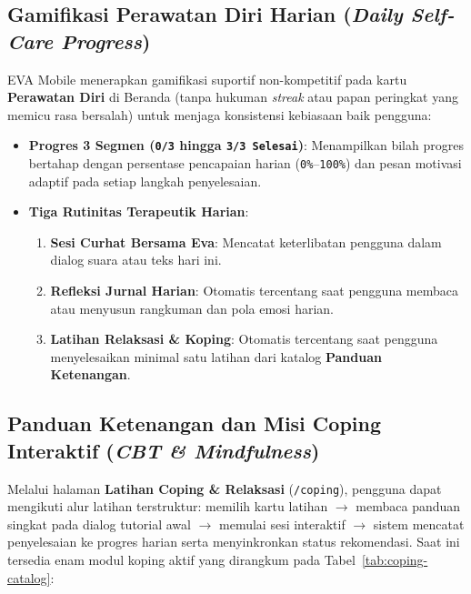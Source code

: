 \subsection{Gamifikasi Perawatan Diri Harian (\textit{Daily Self-Care Progress})}
EVA Mobile menerapkan gamifikasi suportif non-kompetitif pada kartu \textbf{Perawatan Diri} di Beranda (tanpa hukuman \textit{streak} atau papan peringkat yang memicu rasa bersalah) untuk menjaga konsistensi kebiasaan baik pengguna:
\begin{itemize}[leftmargin=1.4em]
  \item \textbf{Progres 3 Segmen (\texttt{0/3} hingga \texttt{3/3 Selesai})}: Menampilkan bilah progres bertahap dengan persentase pencapaian harian (\texttt{0\%}--\texttt{100\%}) dan pesan motivasi adaptif pada setiap langkah penyelesaian.
  \item \textbf{Tiga Rutinitas Terapeutik Harian}:
  \begin{enumerate}[leftmargin=1.4em]
    \item \textbf{Sesi Curhat Bersama Eva}: Mencatat keterlibatan pengguna dalam dialog suara atau teks hari ini.
    \item \textbf{Refleksi Jurnal Harian}: Otomatis tercentang saat pengguna membaca atau menyusun rangkuman dan pola emosi harian.
    \item \textbf{Latihan Relaksasi \& Koping}: Otomatis tercentang saat pengguna menyelesaikan minimal satu latihan dari katalog \textbf{Panduan Ketenangan}.
  \end{enumerate}
\end{itemize}


\subsection{Panduan Ketenangan dan Misi Coping Interaktif (\textit{CBT \& Mindfulness})}
Melalui halaman \textbf{Latihan Coping \& Relaksasi} (\texttt{/coping}), pengguna dapat mengikuti alur latihan terstruktur: memilih kartu latihan $\rightarrow$ membaca panduan singkat pada dialog tutorial awal $\rightarrow$ memulai sesi interaktif $\rightarrow$ sistem mencatat penyelesaian ke progres harian serta menyinkronkan status rekomendasi. Saat ini tersedia enam modul koping aktif yang dirangkum pada Tabel~\ref{tab:coping-catalog}:

